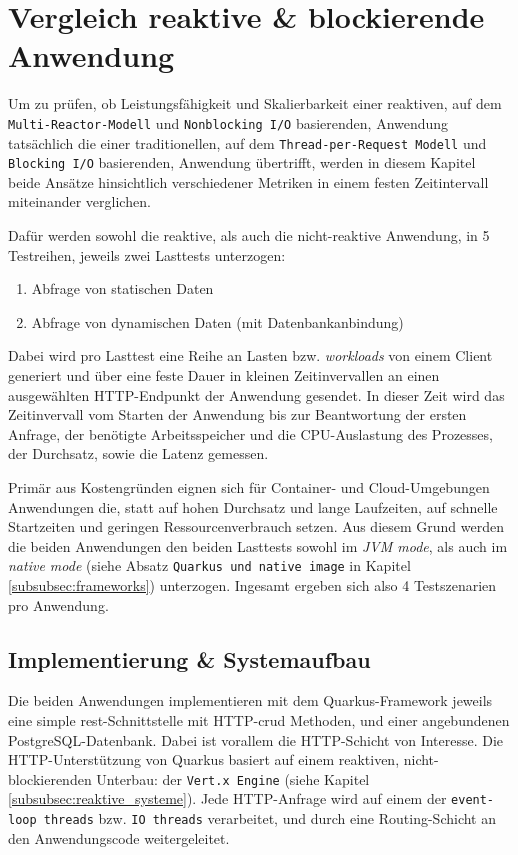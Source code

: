 \section {Vergleich reaktive \& blockierende Anwendung}
\label{section:vergleich_reaktiv_blockierend}
Um zu prüfen, ob Leistungsfähigkeit und Skalierbarkeit einer reaktiven, auf dem \newline
\verb|Multi-Reactor-Modell| und \verb|Nonblocking I/O| basierenden,
Anwendung tatsächlich die einer traditionellen, auf dem \verb|Thread-per-Request Modell| und \verb|Blocking I/O| basierenden, Anwendung übertrifft, werden in
diesem Kapitel beide Ansätze hinsichtlich verschiedener Metriken in einem festen Zeitintervall miteinander verglichen.

Dafür werden sowohl die reaktive, als auch die nicht-reaktive Anwendung, in 5 Testreihen, jeweils zwei Lasttests unterzogen:
\begin{enumerate}
  \item Abfrage von statischen Daten
  \item Abfrage von dynamischen Daten (mit Datenbankanbindung)
\end{enumerate}
Dabei wird pro Lasttest eine Reihe an Lasten bzw. \textit{workloads} von einem Client generiert und über eine feste Dauer in kleinen Zeitinvervallen
an einen ausgewählten HTTP-Endpunkt der Anwendung gesendet.
In dieser Zeit wird das Zeitinvervall vom Starten der Anwendung bis zur Beantwortung der ersten Anfrage,
der benötigte Arbeitsspeicher und die CPU-Auslastung des Prozesses, der Durchsatz, sowie die Latenz gemessen.

Primär aus Kostengründen eignen sich für Container- und Cloud-Umgebungen Anwendungen die, statt auf hohen Durchsatz und lange Laufzeiten,
auf schnelle Startzeiten und geringen Ressourcenverbrauch setzen.
Aus diesem Grund werden die beiden Anwendungen den beiden Lasttests sowohl im \textit{JVM mode}, als auch im \textit{native mode}
(siehe Absatz \verb|Quarkus und native image| in Kapitel \ref{subsubsec:frameworks})
unterzogen. Ingesamt ergeben sich also 4 Testszenarien pro Anwendung.

\subsection{Implementierung \& Systemaufbau}
\label{section:implementierung}
Die beiden Anwendungen implementieren mit dem Quarkus-Framework jeweils eine simple \acrshort{rest}-Schnittstelle mit HTTP-\acrshort{crud} Methoden,
und einer angebundenen PostgreSQL-Datenbank.
Dabei ist vorallem die HTTP-Schicht von Interesse. Die HTTP-Unterstützung von Quarkus basiert auf einem reaktiven, nicht-blockierenden
Unterbau: der \verb|Vert.x Engine| (siehe Kapitel \ref{subsubsec:reaktive_systeme}).
Jede HTTP-Anfrage wird auf einem der \verb|event-loop threads| bzw. \verb|IO threads|
verarbeitet, und durch eine Routing-Schicht an den Anwendungscode weitergeleitet.

